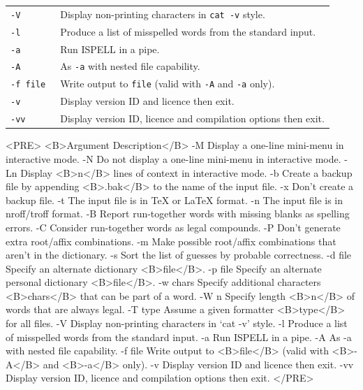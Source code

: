 \documentclass[twoside,11pt]{article}
\newenvironment{latexonly}{}{}
\begin{document}
\begin{latexonly}
\begin{tabular}{ll}
{\tt -V       } & Display non-printing characters in \verb+cat -v+ style.\\
{\tt -l       } & Produce a list of misspelled words from the standard input.\\

{\tt -a       } & Run ISPELL in a pipe.\\
{\tt -A       } & As \verb+-a+ with nested file capability.\\
{\tt -f file  } & Write output to \verb+file+ (valid with \verb+-A+ and
                  \verb+-a+ only).\\

{\tt -v       } & Display version ID and licence then exit.\\
{\tt -vv      } & Display version ID, licence and compilation options then
                  exit.\\
\end{tabular}
\end{latexonly}

\begin{htmlonly}
\begin{rawhtml}
<PRE>
<B>Argument  Description</B>
-M        Display a one-line mini-menu in interactive mode.
-N        Do not display a one-line mini-menu in interactive mode.
-Ln       Display <B>n</B> lines of context in interactive mode.
-b        Create a backup file by appending <B>.bak</B> to the
          name of the input file.
-x        Don't create a backup file.
-t        The input file is in TeX or LaTeX format.
-n        The input file is in nroff/troff format.
-B        Report run-together words with missing blanks as
          spelling errors.
-C        Consider run-together words as legal compounds.
-P        Don't generate extra root/affix combinations.
-m        Make possible root/affix combinations that aren't in
          the dictionary.
-s        Sort the list of guesses by probable correctness.
-d file   Specify an alternate dictionary <B>file</B>.
-p file   Specify an alternate personal dictionary <B>file</B>.
-w chars  Specify additional characters <B>chars</B> that can be part of
          a word.
-W n      Specify length <B>n</B> of words that are always legal.
-T type   Assume a given formatter <B>type</B> for all files.
-V        Display non-printing characters in `cat -v' style.
-l        Produce a list of misspelled words from the standard input.
-a        Run ISPELL in a pipe.
-A        As -a with nested file capability.
-f file   Write output to <B>file</B> (valid with <B>-A</B> and <B>-a</B> only).
-v        Display version ID and licence then exit.
-vv       Display version ID, licence and compilation options then exit.
</PRE>
\end{rawhtml}
\end{htmlonly}
\end{document}
